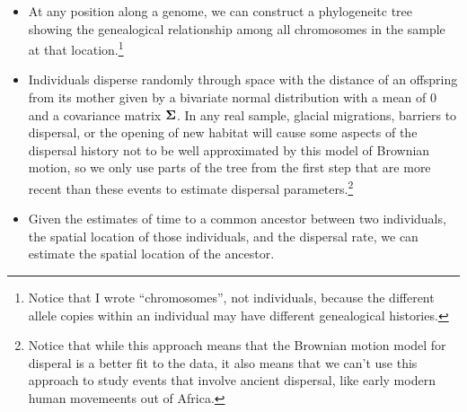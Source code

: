 \documentclass[12pt]{article}
\begin{document}
\begin{itemize}

  \item At any position along a genome, we can construct a
    phylogeneitc tree showing the genealogical relationship among all
    chromosomes in the sample at that location.\footnote{Notice that I
      wrote ``chromosomes'', not individuals, because the different
      allele copies within an individual may have different
      genealogical histories.} 

  \item Individuals disperse randomly through space with the distance
    of an offspring from its mother given by a bivariate normal
    distribution with a mean of 0 and a covariance matrix
    $\bf\Sigma$. In any real sample, glacial migrations,
    barriers to dispersal, or the opening of new habitat will cause
    some aspects of the dispersal history not to be well approximated
    by this model of Brownian motion, so we only use parts of the tree
    from the first step that are more recent than these events to
    estimate dispersal parameters.\footnote{Notice that while this
      approach means that the Brownian motion model for disperal is a
      better fit to the data, it also means that we can't use this
      approach to study events that involve ancient dispersal, like
      early modern human movemeents out of Africa.}

  \item Given the estimates of time to a common ancestor between two
    individuals, the spatial location of those individuals, and the
    dispersal rate, we can estimate the spatial location of the
    ancestor. 

\end{itemize}
\end{document}
